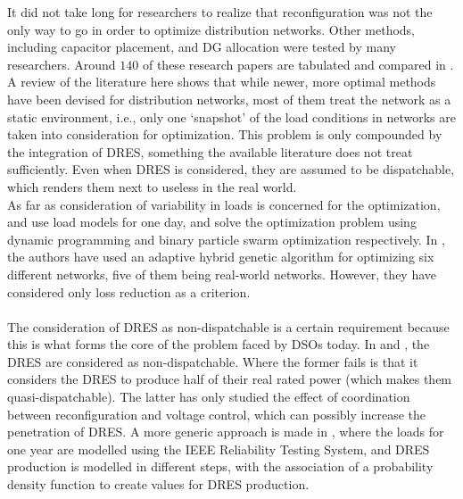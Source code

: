 It did not take long for researchers to realize that reconfiguration was not the only way to go in order to optimize distribution networks. Other methods, including capacitor placement, and DG allocation were tested by many researchers. Around $140$ of these research papers are tabulated and compared in \cite{KalAgn14}. A review of the literature here shows that while newer, more optimal methods have been devised for distribution networks, most of them treat the network as a static environment, i.e., only one `snapshot' of the load conditions in networks are taken into consideration for optimization. This problem is only compounded by the integration of DRES, something the available literature does not treat sufficiently. Even when DRES is considered, they are assumed to be dispatchable, which renders them next to useless in the real world.\\

As far as consideration of variability in loads is concerned for the optimization, \cite{Lopez2004} and \cite{Yin2009} use load models for one day, and solve the optimization problem using dynamic programming and binary particle swarm optimization respectively. In \cite{QueLyr2009}, the authors have used an adaptive hybrid genetic algorithm for optimizing six different networks, five of them being real-world networks. However, they have considered only loss reduction as a criterion.\\\ \\

The consideration of DRES as non-dispatchable is a certain requirement because this is what forms the core of the problem faced by DSOs today. In \cite{OlaNik2008} and \cite{SuLu2011}, the DRES are considered as non-dispatchable. Where the former fails is that it considers the DRES to produce half of their real rated power (which makes them quasi-dispatchable). The latter has only studied the effect of coordination between reconfiguration and voltage control, which can possibly increase the penetration of DRES. A more generic approach is made in \cite{Zidan2012}, where the loads for one year are modelled using the IEEE Reliability Testing System, and DRES production is modelled in different steps, with the association of a probability density function to create values for DRES production.\\

